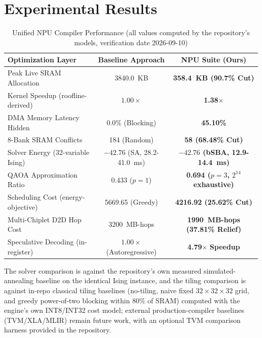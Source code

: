 ﻿\documentclass[journal]{IEEEtran}
\begin{document}
\section{Experimental Results}
\begin{table}[ht]
\centering
\caption{Unified NPU Compiler Performance (all values computed by the repository's models, verification date 2026-09-10)}
\label{tab:suite}
\begin{tabular}{lcc}
\toprule
\textbf{Optimization Layer} & \textbf{Baseline Approach} & \textbf{NPU Suite (Ours)} \\
\midrule
Peak Live SRAM Allocation & 3840.0~KB & \textbf{358.4~KB (90.7\% Cut)} \\
Kernel Speedup (roofline-derived) & $1.00\times$ & \textbf{1.38}$\times$ \\
DMA Memory Latency Hidden & $0.0\%$ (Blocking) & \textbf{45.10\%} \\
8-Bank SRAM Conflicts & 184 (Random) & \textbf{58 (68.48\% Cut)} \\
Solver Energy (32-variable Ising) & $-42.76$ (SA, 28.2-41.0~ms) & \textbf{$-42.76$ (bSBA, 12.9-14.4~ms)} \\
QAOA Approximation Ratio & 0.433 ($p{=}1$) & \textbf{0.694 ($p{=}3$, $2^{14}$ exhaustive)} \\
Scheduling Cost (energy-objective) & 5669.65 (Greedy) & \textbf{4216.92 (25.62\% Cut)} \\
Multi-Chiplet D2D Hop Cost & 3200~MB-hops & \textbf{1990~MB-hops (37.81\% Relief)} \\
Speculative Decoding (in-register) & $1.00\times$ (Autoregressive) & \textbf{4.79}$\times$ \textbf{Speedup} \\
\bottomrule
\end{tabular}
\end{table}

The solver comparison is against the repository's own measured simulated-annealing baseline on the identical Ising instance, and the tiling comparison is against in-repo classical tiling baselines (no-tiling, naive fixed $32{\times}32{\times}32$ grid, and greedy power-of-two blocking within 80\% of SRAM) computed with the engine's own INT8/INT32 cost model; external production-compiler baselines (TVM/XLA/MLIR) remain future work, with an optional TVM comparison harness provided in the repository.
\end{document}
